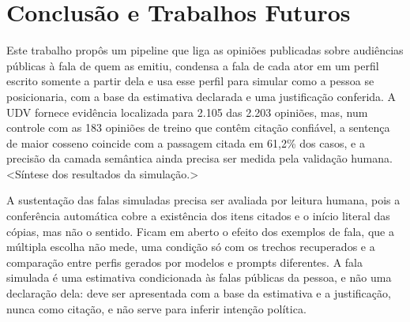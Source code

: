 \section{Conclus\~ao e Trabalhos Futuros}
\label{sec:conclusao}

Este trabalho propôs um pipeline que liga as opiniões publicadas sobre audiências públicas à fala de
quem as emitiu, condensa a fala de cada ator em um perfil escrito somente a partir dela e usa esse
perfil para simular como a pessoa se posicionaria, com a base da estimativa declarada e uma
justificação conferida. A UDV fornece evidência localizada para 2.105 das 2.203 opiniões, mas, num
controle com as 183 opiniões de treino que contêm citação confiável, a sentença de maior cosseno
coincide com a passagem citada em 61,2\% dos casos, e a precisão da camada semântica ainda precisa
ser medida pela validação humana. <Síntese dos resultados da simulação.>

A sustentação das falas simuladas precisa ser avaliada por leitura humana, pois a conferência
automática cobre a existência dos itens citados e o início literal das cópias, mas não o sentido.
Ficam em aberto o efeito dos exemplos de fala, que a múltipla escolha não mede, uma condição só com
os trechos recuperados e a comparação entre perfis gerados por modelos e prompts diferentes. A fala
simulada é uma estimativa condicionada às falas públicas da pessoa, e não uma declaração dela: deve
ser apresentada com a base da estimativa e a justificação, nunca como citação, e não serve para
inferir intenção política.
